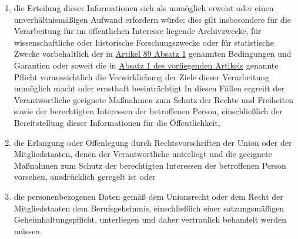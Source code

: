 \begin{enumerate}
\begin{enumerate}
    \item die Erteilung dieser Informationen sich als unmöglich erweist oder einen unverhältnismäßigen Aufwand erfordern
     würde; dies gilt insbesondere für die Verarbeitung für im öffentlichen Interesse liegende Archivzwecke, für
     wissenschaftliche oder historische Forschungszwecke oder für statistische Zwecke vorbehaltlich der in
     \hyperref[itm:89-1]{Artikel 89 Absatz 1} genannten Bedingungen und Garantien oder soweit die in \hyperref[itm:14-1]
      {Absatz 1 des vorliegenden Artikels} genannte Pflicht voraussichtlich die Verwirklichung der Ziele dieser
      Verarbeitung unmöglich macht oder ernsthaft beeinträchtigt In diesen Fällen ergreift der Verantwortliche
      geeignete Maßnahmen zum Schutz der Rechte und Freiheiten sowie der berechtigten Interessen der betroffenen
      Person, einschließlich der Bereitstellung dieser Informationen für die Öffentlichkeit,
    \label{itm:14-5b}

    \item die Erlangung oder Offenlegung durch Rechtsvorschriften der Union oder der Mitgliedstaaten, denen der
     Verantwortliche unterliegt und die geeignete Maßnahmen zum Schutz der berechtigten Interessen der betroffenen
     Person vorsehen, ausdrücklich geregelt ist oder
    \label{itm:14-5c}

    \item die personenbezogenen Daten gemäß dem Unionsrecht oder dem Recht der Mitgliedstaaten dem Berufsgeheimnis,
     einschließlich einer satzungsmäßigen Geheimhaltungspflicht, unterliegen und daher vertraulich behandelt werden
     müssen.
    \label{itm:14-5d}

  \end{enumerate}

\end{enumerate}


